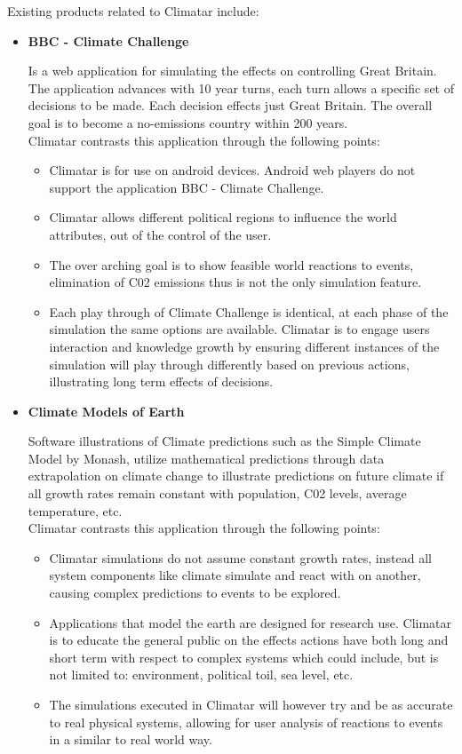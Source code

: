 \documentclass[]{article}
\begin{document}
Existing products related to Climatar include: 
\begin{itemize}
	\item \textbf{BBC - Climate Challenge} 
		
		\cite{BBC}Is a web application for simulating the effects on controlling Great Britain. The application advances with 10 year turns, each turn allows a specific set of decisions to be made. Each decision effects just Great Britain. The overall goal is to become a no-emissions country within 200 years. \\
		Climatar contrasts this application through the following points:
		\begin{itemize}
			\item Climatar is for use on android devices. Android web players do not support the application BBC - Climate Challenge.
			\item Climatar allows different political regions to influence the world attributes, out of the control of the user.
			\item The over arching goal is to show feasible world reactions to events, elimination of C02 emissions thus is not the only simulation feature.
			\item Each play through of Climate Challenge is identical, at each phase of the simulation the same options are available. Climatar is to engage users interaction and knowledge growth by ensuring different instances of the simulation will play through differently based on previous actions, illustrating long term effects of decisions.
		\end{itemize}
	
	\item \textbf{Climate Models of Earth}

		Software illustrations of Climate predictions such as the Simple Climate Model by Monash, utilize mathematical predictions through data extrapolation on climate change to illustrate predictions on future climate if all growth rates remain constant with population, C02 levels, average temperature, etc\cite{ClimM}.\\
	Climatar contrasts this application through the following points:
		\begin{itemize}
			\item Climatar simulations do not assume constant growth rates, instead all system components like climate simulate and react with on another, causing complex predictions to events to be explored.
			\item Applications that model the earth are designed for  research use. Climatar is to educate the general public on the effects actions have both long and short term with respect to complex systems which could include, but is not limited to: environment, political toil, sea level, etc.
			\item The simulations executed in Climatar will however try and be as accurate to real physical systems, allowing for user analysis of reactions to events in a similar to real world way.
		\end{itemize}	 


\end{itemize}
\end{document}
